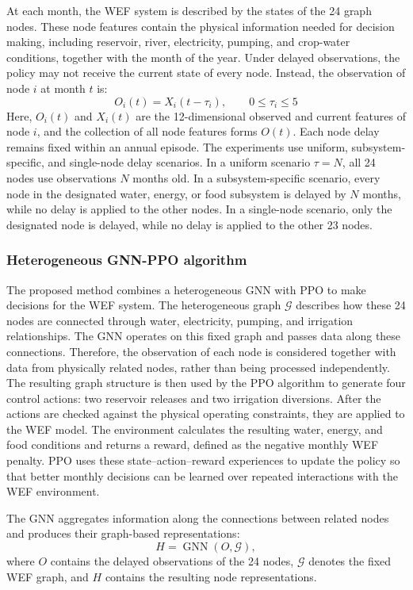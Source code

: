 \documentclass [a4paper,fleqn] {cas-dc}
\begin{document}
At each month, the WEF system is described by the states of the 24 graph nodes. These node features contain the physical information needed for decision making, including reservoir, river, electricity, pumping, and crop-water conditions, together with the month of the year. Under delayed observations, the policy may not receive the current state of every node. Instead, the observation of node $i$ at month $t$ is:
\begin{equation}
  O_i(t)=X_i(t-\tau_i),
  \qquad 0\leq\tau_i\leq5 
  \label{eq:policy-state}
\end{equation}
Here, $O_i(t)$ and $X_i(t)$ are the 12-dimensional observed and current features of node $i$, and the collection of all node features forms $O(t)$. Each node delay remains fixed within an annual episode. The experiments use uniform, subsystem-specific, and single-node delay scenarios. In a uniform scenario $\tau=N$, all 24 nodes use observations $N$ months old. In a subsystem-specific scenario, every node in the designated water, energy, or food subsystem is delayed by $N$ months, while no delay is applied to the other nodes. In a single-node scenario, only the designated node is delayed, while no delay is applied to the other 23 nodes.
\subsubsection{Heterogeneous GNN-PPO algorithm}
\label{sec32}

The proposed method combines a heterogeneous GNN with PPO to make decisions for the WEF system. The heterogeneous graph $\mathcal G$ describes how these 24 nodes are connected through water, electricity, pumping, and irrigation relationships. The GNN operates on this fixed graph and passes data along these connections. Therefore, the observation of each node is considered together with data from physically related nodes, rather than being processed independently. The resulting graph structure is then used by the PPO algorithm to generate four control actions: two reservoir releases and two irrigation diversions. After the actions are checked against the physical operating constraints, they are applied to the WEF model. The environment calculates the resulting water, energy, and food conditions and returns a reward, defined as the negative monthly WEF penalty. PPO uses these state--action--reward experiences to update the policy so that better monthly decisions can be learned over repeated interactions with the WEF environment.

The GNN aggregates information along the connections between related nodes and produces their graph-based representations:
\begin{equation}
  H=\operatorname{GNN}(O,\mathcal G),
  \label{eq:gnn-encoding}
\end{equation}
where $O$ contains the delayed observations of the 24 nodes, $\mathcal G$ denotes the fixed WEF graph, and $H$ contains the resulting node representations.
\end{document}

